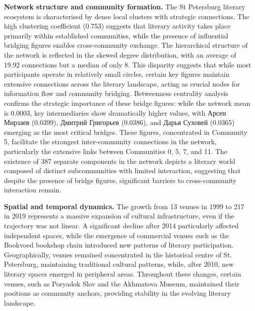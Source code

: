 \documentclass{jcls}
\begin{document}
\textbf{Network structure and community formation. }The St Petersburg literary ecosystem is characterised by dense local clusters with strategic connections. The high clustering coefficient (0.753) suggests that literary activity takes place primarily within established communities, while the presence of influential bridging figures enables cross-community exchange. The hierarchical structure of the network is reflected in the skewed degree distribution, with an average of 19.92 connections but a median of only 8. This disparity suggests that while most participants operate in relatively small circles, certain key figures maintain extensive connections across the literary landscape, acting as crucial nodes for information flow and community bridging. Betweenness centrality analysis confirms the strategic importance of these bridge figures: while the network mean is 0.0003, key intermediaries show dramatically higher values, with Арсен Мирзаев (0.0399), Дмитрий Григорьев (0.0386), and Дарья Суховей (0.0365) emerging as the most critical bridges. These figures, concentrated in Community 5, facilitate the strongest inter-community connections in the network, particularly the extensive links between Communities 0, 5, 7, and 11. The existence of 387 separate components in the network depicts a literary world composed of distinct subcommunities with limited interaction, suggesting that despite the presence of bridge figures, significant barriers to cross-community interaction remain.

\textbf{Spatial and temporal dynamics.} The growth from 13 venues in 1999 to 217 in 2019 represents a massive expansion of cultural infrastructure, even if the trajectory was not linear. A significant decline after 2014 particularly affected independent spaces, while the emergence of commercial venues such as the Bookvoed bookshop chain introduced new patterns of literary participation. Geographically, venues remained concentrated in the historical centre of St. Petersburg, maintaining traditional cultural patterns, while, after 2010, new literary spaces emerged in peripheral areas. Throughout these changes, certain venues, such as Poryadok Slov and the Akhmatova Museum, maintained their positions as community anchors, providing stability in the evolving literary landscape.
\end{document}
